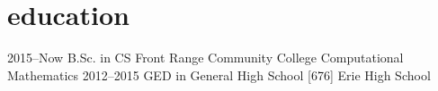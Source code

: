 \documentclass[]{cv-style}
\begin{document}
\vspace{-0.6cm}
\section{education}
\vspace{-0.3cm}
\begin{entrylist}
\entry
{2015--Now}
  {B.Sc. {\normalfont in CS}}
  {Front Range Community College}
  {Computational Mathematics}
\entry
{2012--2015}
  {GED {\normalfont in General High School [676]}}
  {Erie High School}
  {\vspace{-0.3cm}}
\end{entrylist}
\nopagebreak
\end{document}

